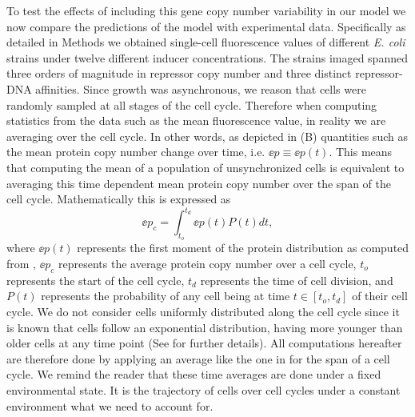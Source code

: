 To test the effects of including this gene copy number variability in our model
we now compare the predictions of the model with experimental data.
Specifically as detailed in Methods we obtained single-cell fluorescence values
of different {\it E. coli} strains under twelve different inducer
concentrations. The strains imaged spanned three orders of magnitude in
repressor copy number and three distinct repressor-DNA affinities. Since growth
was asynchronous, we reason that cells were randomly sampled at all stages of
the cell cycle. Therefore when computing statistics from the data such as the
mean fluorescence value, in reality we are averaging over the cell cycle. In
other words, as depicted in (B) quantities such as the
mean protein copy number change over time, i.e. $\ee{p} \equiv \ee{p(t)}$. This
means that computing the mean of a population of unsynchronized cells is
equivalent to averaging this time dependent mean protein copy number over the
span of the cell cycle. Mathematically this is expressed as
\begin{equation}
	\ee{p}_c = \int_{t_o}^{t_d} \ee{p(t)} P(t) dt,
	\label{eq_time_avg}
\end{equation}
where $\ee{p(t)}$ represents the first moment of the protein distribution as
computed from , $\ee{p}_c$ represents the average protein
copy number over a cell cycle, $t_o$ represents the start of the cell cycle,
$t_d$ represents the time of cell division, and $P(t)$ represents the
probability of any cell being at time $t \in [t_o, t_d]$ of their cell cycle.
We do not consider cells uniformly distributed along the cell cycle since it is
known that cells follow an exponential distribution, having more younger than
older cells at any time point \cite{Powell1956} (See 
for further details). All computations hereafter are therefore done by applying
an average like the one in  for the span of a cell cycle. We
remind the reader that these time averages are done under a fixed environmental
state. It is the trajectory of cells over cell cycles under a constant
environment what we need to account for.

